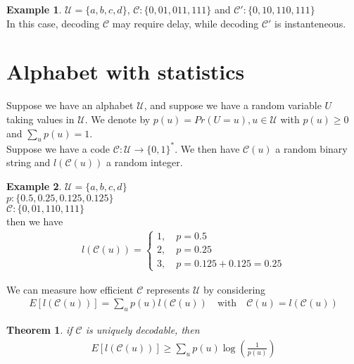 \documentclass[twoside]{article}
\newtheorem{theorem}{Theorem}[section]
\theoremstyle{definition} %
\newtheorem{example}{Example}
\def\U{\mathcal{U}}
\def\C{\mathcal{C}}
\begin{document}
\begin{example}
  $\U = \{a, b, c, d\}$, $\C: \{0, 01, 011, 111\}$ and $\C': \{0, 10, 110, 111\}$\\
  In this case, decoding $\C$ may require delay, while decoding $\C'$ is instanteneous.
\end{example}


\cleardoublepage
\section{Alphabet with statistics}

Suppose we have an alphabet $\U$, and suppose we have a random variable $U$ taking values in $\U$. We denote by $p(u) = Pr(U = u), u \in \U$ with $p(u) \geq 0$ and $\sum_u p(u) = 1$.\\

Suppose we have a code $\C: \U \rightarrow \{0, 1\}^*$. We then have $\C(u)$ a random binary string and $l(\C(u))$ a random integer.

\begin{example}
  $\U = \{a, b, c, d\}$\\
  $p: \{0.5, 0.25, 0.125, 0.125\}$ \\
  $\C: \{0, 01, 110, 111\}$ \\

  then we have
  \begin{align*}
    l(\C(u)) =
    \left\{
      \begin{array}{l}
        1, \quad p = 0.5 \\
        2, \quad p = 0.25 \\
        3, \quad p = 0.125 + 0.125 = 0.25
      \end{array}
    \right.
  \end{align*}
\end{example}

We can measure how efficient $\C$ represents $\U$ by considering
\begin{align*}
  E[l(\C(u))] = \sum_u p(u)l(\C(u)) \quad \text{with} \quad \C(u) = l(\C(u))
\end{align*}

\begin{theorem}
  if $\C$ is uniquely decodable, then
  \begin{align*}
    E[l(\C(u))] \geq \sum_u p(u) \log(\frac{1}{p(u)})
  \end{align*}
\end{theorem}
\end{document}
